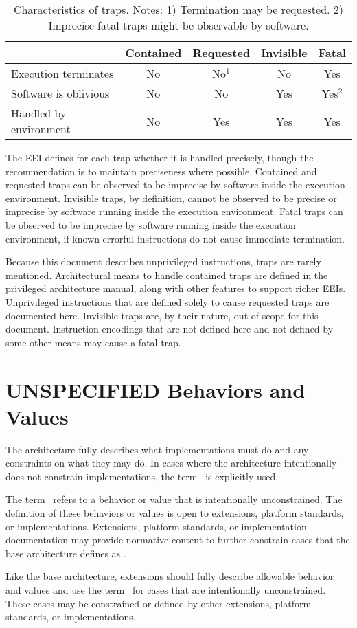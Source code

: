 \begin{table}[hbt]
  \centering
  \begin{tabular}{|l|c|c|c|c|}
      \hline
      & Contained & Requested & Invisible & Fatal\\
      \hline
      Execution terminates   & No & No$^{1}$ & No  & Yes \\
      Software is oblivious  & No & No       & Yes & Yes$^{2}$ \\
      Handled by environment & No & Yes      & Yes & Yes \\
      \hline
  \end{tabular}
  \caption{Characteristics of traps. Notes: 1) Termination may be
    requested. 2) Imprecise fatal traps might be observable by software.}
\label{table:trapcharacteristics}
\end{table}

The EEI defines for each trap whether it is handled precisely, though
the recommendation is to maintain preciseness where possible.
Contained and requested traps can be observed to be imprecise by
software inside the execution environment.  Invisible traps, by
definition, cannot be observed to be precise or imprecise by software
running inside the execution environment.  Fatal traps can be observed
to be imprecise by software running inside the execution environment,
if known-errorful instructions do not cause immediate termination.

Because this document describes unprivileged instructions, traps are
rarely mentioned.  Architectural means to handle contained traps are
defined in the privileged architecture manual, along with other
features to support richer EEIs.  Unprivileged instructions that are
defined solely to cause requested traps are documented here.
Invisible traps are, by their nature, out of scope for this document.
Instruction encodings that are not defined here and not defined by
some other means may cause a fatal trap.

\section{UNSPECIFIED Behaviors and Values}

The architecture fully describes what implementations must do and any
constraints on what they may do.  In cases where the architecture
intentionally does not constrain implementations, the term \unspecified\ 
is explicitly used.

The term \unspecified\ refers to a behavior or value that is
intentionally unconstrained.  The definition of these behaviors or
values is open to extensions, platform standards, or implementations.
Extensions, platform standards, or implementation documentation may
provide normative content to further constrain cases that the base
architecture defines as \unspecified.

Like the base architecture, extensions should fully describe allowable
behavior and values and use the term \unspecified\ for cases that are
intentionally unconstrained.  These cases may be constrained or defined
by other extensions, platform standards, or implementations.
